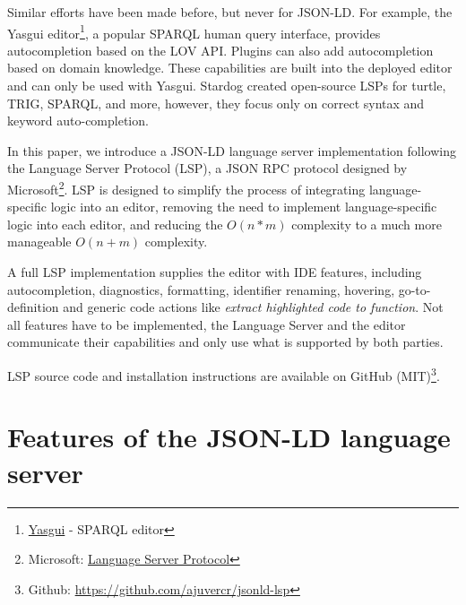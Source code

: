 \documentclass[
]{ceurart}
\begin{document}
Similar efforts have been made before, but never for JSON-LD. 
For example, the Yasgui editor\footnote{\href{https://triply.cc/docs/yasgui/}{Yasgui} - SPARQL editor}, a popular SPARQL human query interface, provides autocompletion based on the LOV API\cite{LOV}. 
Plugins can also add autocompletion based on domain knowledge. 
These capabilities are built into the deployed editor and can only be used with Yasgui.
Stardog created open-source LSPs for turtle, TRIG, SPARQL, and more, however, they focus only on correct syntax and keyword auto-completion\cite{stardog}. 

In this paper, we introduce a JSON-LD language server implementation following the Language Server Protocol (LSP), a JSON RPC protocol designed by Microsoft\footnote{Microsoft: \href{https://microsoft.github.io/language-server-protocol/}{Language Server Protocol}}.
LSP is designed to simplify the process of integrating language-specific logic into an editor, removing the need to implement language-specific logic into each editor, and reducing the \(O(n*m)\) complexity to a much more manageable \(O(n+m)\) complexity\cite{LSP-Multi}.

A full LSP implementation supplies the editor with IDE features, including autocompletion, diagnostics, formatting, identifier renaming, hovering, go-to-definition and generic code actions like \textit{extract highlighted code to function}. 
Not all features have to be implemented, the Language Server and the editor communicate their capabilities and only use what is supported by both parties.

LSP source code and installation instructions are available on GitHub (MIT)\footnote{Github: \href{github.com/ajuvercr/jsonld-lsp}{https://github.com/ajuvercr/jsonld-lsp}}.


\section{Features of the JSON-LD language server}

\end{document}

